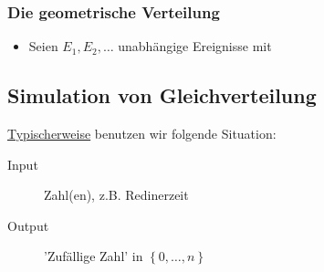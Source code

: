 

\subsubsection{Die geometrische Verteilung}
\begin{itemize}
    \item Seien $E_1,E_2,\ldots$ unabhängige Ereignisse mit
\end{itemize}

\subsection{Simulation von Gleichverteilung}
\underline{Typischerweise} benutzen wir folgende Situation:
\begin{description}
    \item[Input] Zahl(en), z.B. Redinerzeit
    \item[Output] 'Zufällige Zahl' in $\left \{0,\ldots,n\right\} $
\end{description}
